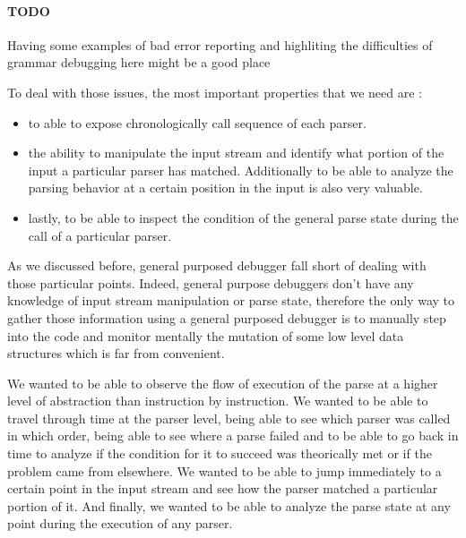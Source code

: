 \paragraph{TODO} Having some examples of bad error reporting and highliting the difficulties of grammar debugging here might be a good place

\bigskip

To deal with those issues, the most important properties that we need are :

\begin{itemize}
	\item to able to expose chronologically call sequence of each parser.%
	\item the ability to manipulate the input stream and identify what portion of the input a particular parser has matched. Additionally to be able to analyze the parsing behavior at a certain position in the input is also very valuable. %
	\item lastly, to be able to inspect the condition of the general parse state during the call of a particular parser. %
\end{itemize}

As we discussed before, general purposed debugger fall short of dealing with those particular points. Indeed, general purpose debuggers don't have any knowledge of input stream manipulation or parse state, therefore the only way to gather those information using a general purposed debugger is to manually step into the code and monitor mentally the mutation of some low level data structures which is far from convenient.

\bigskip

We wanted to be able to observe the flow of execution of the parse at a higher level of abstraction than instruction by instruction. We wanted to be able to travel through time at the parser level, being able to see which parser was called in which order, being able to see where a parse failed and to be able to go back in time to analyze if the condition for it to succeed was theorically met or if the problem came from elsewhere. We wanted to be able to jump immediately to a certain point in the input stream and see how the parser matched a particular portion of it. And finally, we wanted to be able to analyze the parse state at any point during the execution of any parser.

